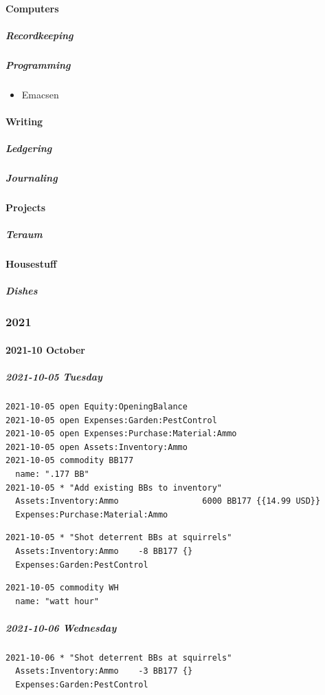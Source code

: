 \documentclass[11pt]{article}
\begin{document}
\paragraph*{Computers}
\label{sec:org307debb}
\subparagraph*{Recordkeeping}
\label{sec:org63cc4fe}
\subparagraph*{Programming}
\label{sec:orga345207}
\begin{itemize}
\item Emacsen
\label{sec:org5dfc0db}
\end{itemize}
\paragraph*{Writing}
\label{sec:org80aec36}
\subparagraph*{Ledgering}
\label{sec:org8a96fcf}
\subparagraph*{Journaling}
\label{sec:orgb338569}
\paragraph*{Projects}
\label{sec:org211a38b}
\subparagraph*{Teraum}
\label{sec:org6a0001d}
\paragraph*{Housestuff}
\label{sec:orgd3c6c7f}
\subparagraph*{Dishes}
\label{sec:orgb75d36e}
\subsubsection*{2021}
\label{sec:org90f27a3}
\paragraph*{2021-10 October}
\label{sec:org561c582}
\subparagraph*{2021-10-05 Tuesday}
\label{sec:org69ee2e0}
\begin{verbatim}
2021-10-05 open Equity:OpeningBalance
2021-10-05 open Expenses:Garden:PestControl
2021-10-05 open Expenses:Purchase:Material:Ammo
2021-10-05 open Assets:Inventory:Ammo
2021-10-05 commodity BB177
  name: ".177 BB"
2021-10-05 * "Add existing BBs to inventory"
  Assets:Inventory:Ammo                 6000 BB177 {{14.99 USD}}
  Expenses:Purchase:Material:Ammo
\end{verbatim}
\begin{verbatim}
2021-10-05 * "Shot deterrent BBs at squirrels"
  Assets:Inventory:Ammo    -8 BB177 {}
  Expenses:Garden:PestControl
\end{verbatim}
\begin{verbatim}
2021-10-05 commodity WH
  name: "watt hour"
\end{verbatim}
\subparagraph*{2021-10-06 Wednesday}
\label{sec:orgc9fb595}
\begin{verbatim}
2021-10-06 * "Shot deterrent BBs at squirrels"
  Assets:Inventory:Ammo    -3 BB177 {}
  Expenses:Garden:PestControl

\end{verbatim}
\end{document}
